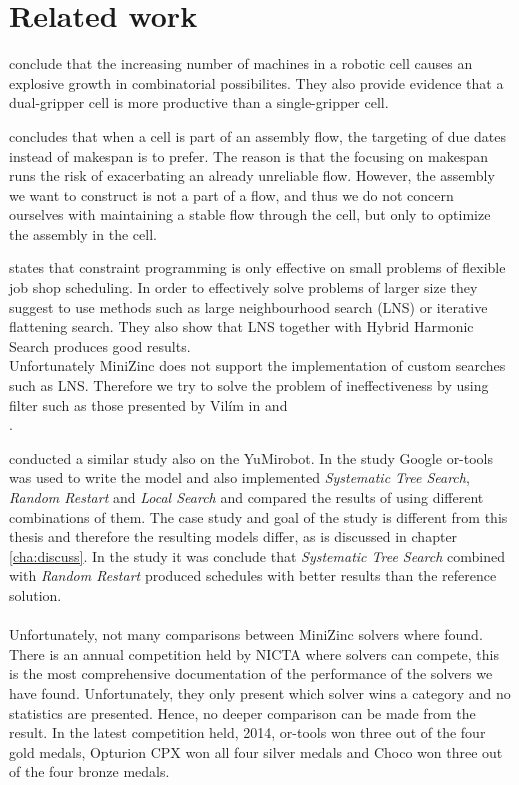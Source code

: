 \section{Related work}
\cite{sethi_2006} conclude that the increasing number of machines in a robotic cell causes an explosive growth in combinatorial possibilites. They also provide evidence that a dual-gripper cell is more productive than a single-gripper cell.

\cite{thornblad_2013} concludes that when a cell is part of an assembly flow, the targeting of due dates instead of makespan is to prefer. The reason is that the focusing on makespan runs the risk of exacerbating an already unreliable flow. However, the assembly we want to construct is not a part of a flow, and thus we do not concern ourselves with maintaining a stable flow through the cell, but only to optimize the assembly in the cell.

\cite{yuan_2013} states that constraint programming is only effective on small problems of flexible job shop scheduling. In order to effectively solve problems of larger size they suggest to use methods such as large neighbourhood search (LNS) or iterative flattening search. They also show that LNS together with Hybrid Harmonic Search produces good results.
\\
Unfortunately MiniZinc does not support the implementation of custom searches such as LNS. Therefore we try to solve the problem of ineffectiveness by using filter such as those presented by Vilím in \cite{VilimBartak2002Batch} \cite{Vilim2002Precedence} and \\\cite{VilimBartak2002Sequence}.

\cite{ejenstam_2014} conducted a similar study also on the YuMi\textsuperscript\textregistered robot. In the study Google or-tools was used to write the model and also implemented \emph{Systematic Tree Search}, \emph{Random Restart} and \emph{Local Search} and compared the results of using different combinations of them. The case study and goal of the study is different from this thesis and therefore the resulting models differ, as is discussed in chapter \ref{cha:discuss}. In the study it was conclude that \emph{Systematic Tree Search} combined with \emph{Random Restart} produced schedules with better results than the reference solution.
\\\\
Unfortunately, not many comparisons between MiniZinc solvers where found. There is an annual competition held by NICTA where solvers can compete, this is the most comprehensive documentation of the performance of the solvers we have found. Unfortunately, they only present which solver wins a category and no statistics are presented. Hence, no deeper comparison can be made from the result. In the latest competition held, 2014, or-tools won three out of the four gold medals, Opturion CPX won all four silver medals and Choco won three out of the four bronze medals\cite{mz_result_2014}.

